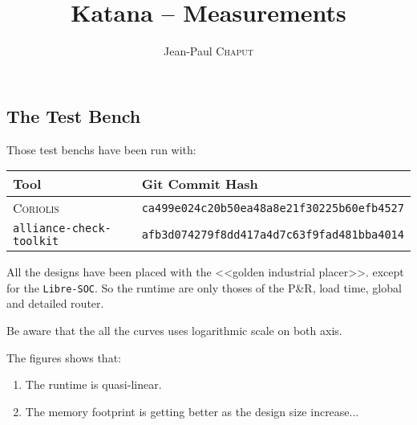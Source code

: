 \documentclass[11pt]{article}
\newcommand {\Chaput} {\textsc{Chaput}\xspace}
\begin{document}
   

   \title{Katana -- Measurements}
   \author{Jean-Paul \Chaput}

   \maketitle

   \thispagestyle{fancy}

   \subsection*{The Test Bench}

   Those test benchs have been run with:

   \begin{tabular}{|l|l|}
      \hline
      \textbf{Tool}                   & \textbf{Git Commit Hash} \\
      \hline
      \textsc{Coriolis}               & \texttt{ca499e024c20b50ea48a8e21f30225b60efb4527} \\
      \texttt{alliance-check-toolkit} & \texttt{afb3d074279f8dd417a4d7c63f9fad481bba4014} \\
      \hline
   \end{tabular}

   All the designs have been placed with the <<golden industrial placer>>.
   except for the \texttt{Libre-SOC}. So the runtime are only thoses of
   the P\&R, load time, global and detailed router.

   Be aware that the all the curves uses logarithmic scale on both axis.

   The figures shows that:
   \begin{enumerate}
     \item The runtime is quasi-linear.
     \item The memory footprint is getting better as the design size
           increase...
   \end{enumerate}


   \begin{center}
   \end{center}
   \begin{center}
   \end{center}


%  
%      
\end{document}
